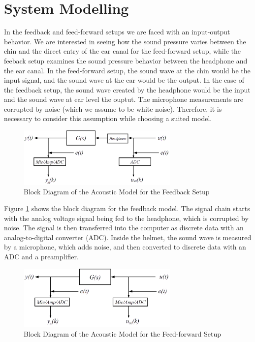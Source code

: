 \section{System Modelling}\label{sec: sysmod}


In the feedback and feed-forward setups we are faced with an input-output behavior. We are interested in seeing how the sound pressure varies between the chin and the direct entry of the ear canal for the feed-forward setup, while the feeback setup examines the sound pressure behavior between the headphone and the ear canal. In the feed-forward setup, the sound wave at the chin would be the input signal, and the sound wave at the ear would be the output. In the case of the feedback setup, the sound wave created by the headphone would be the input and the sound wave at ear level the ouptut. The microphone measurements are corrupted by noise (which we assume to be white noise). Therefore, it is necessary to consider this assumption while choosing a suited model.\\

\begin{figure}[h]
\centering
\includegraphics[width=0.7\textwidth]{pics/modelfb}
\caption{Block Diagram of the Acoustic Model for the Feedback Setup}
\label{fig:modelfb}
\end{figure}

Figure \ref{fig:modelfb} shows the block diagram for the feedback model. The signal chain starts with the analog voltage signal being fed to the headphone, which is corrupted by noise. The signal is then transferred into the computer as discrete data with an analog-to-digital converter (ADC). Inside the helmet, the sound wave is measured by a microphone, which adds noise, and then converted to discrete data with an ADC and a preamplifier. \\

\begin{figure}[h]
\centering
\includegraphics[width=0.7\textwidth]{pics/modelff}
\caption{Block Diagram of the Acoustic Model for the Feed-forward Setup}
\label{fig:modelff}
\end{figure}

